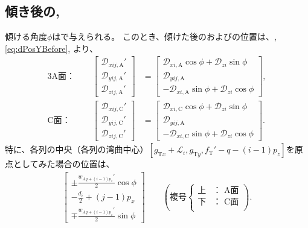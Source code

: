 \subsection{傾き後の\AfaceDimple, \CfaceDimple}
傾ける角度$\phi$はで与えられる。
このとき、傾けた後の\AFaceDimpleIRowJ および\CFaceDimpleIRowJ の位置は、, \eqref{eq:dPosYBefore}, より、
\begin{alignat*}{3}
  \text{A面：}&~~&
  \left[
  \begin{array}{c}
    \mathcal D_{xij,\mathrm A}'\\
    \mathcal D_{yij,\mathrm A}'\\
    \mathcal D_{zij,\mathrm A}'
  \end{array}
  \right]
 &= \left[
    \begin{array}{c}
      \mathcal D_{xi,\mathrm A}\cos\phi+\mathcal D_{zi}\sin\phi\\
      \mathcal D_{yij,\mathrm A}\\
      -\mathcal D_{xi,\mathrm A}\sin\phi+\mathcal D_{zi}\cos\phi
    \end{array}
    \right],\\[2pt]
  \text{C面：}&~~&
  \left[
  \begin{array}{c}
    \mathcal D_{xij,\mathrm C}'\\
    \mathcal D_{yij,\mathrm C}'\\
    \mathcal D_{zij,\mathrm C}'
  \end{array}
  \right]
 &= \left[
    \begin{array}{c}
      \mathcal D_{xi,\mathrm C}\cos\phi+\mathcal D_{zi}\sin\phi\\
      \mathcal D_{yij,\mathrm A}\\
      -\mathcal D_{xi,\mathrm C}\sin\phi+\mathcal D_{zi}\cos\phi
    \end{array}
    \right].
\end{alignat*}
特に、各列の中央（各列の湾曲中心）$[g_{\mathrm Tx}+\mathcal L_i, g_{\mathrm Ty}, f_\mathrm T'-q-(i-1)p_z]$を原点としてみた場合の位置は、
\begin{align*}
  \left[
  \begin{array}{c}
    \displaystyle \pm\frac{w_{Aq+(i-1)p_z}'}2\cos\phi\\[6pt]
    \displaystyle -\frac{d_i}2+(j-1)p_x\\[6pt]
    \displaystyle \mp\frac{w_{Aq+(i-1)p_z}'}2\sin\phi
  \end{array}
  \right]\qquad
  \left(
  \text{複号}
  \left\{
  \begin{array}{rl}
    \!\text{上}\!\!\!\!& \text{： A面}\\
    \!\text{下}\!\!\!\!& \text{： C面}\\
  \end{array}
  \right.
  \right).
\end{align*}





